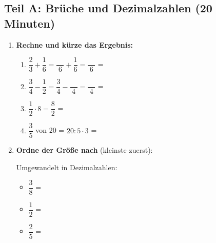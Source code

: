 \subsection*{Teil A: Brüche und Dezimalzahlen (20 Minuten)}

\begin{enumerate}[label=\arabic*.]
    \item \textbf{Rechne und kürze das Ergebnis:}

    \begin{enumerate}[label=\alph*)]
        \item $\dfrac{2}{3} + \dfrac{1}{6} = \dfrac{\phantom{00}}{6} + \dfrac{1}{6} = \dfrac{\phantom{00}}{6}$ = \underline{\hspace{3cm}}

        \item $\dfrac{3}{4} - \dfrac{1}{2} = \dfrac{3}{4} - \dfrac{\phantom{00}}{4} = \dfrac{\phantom{00}}{4}$ = \underline{\hspace{3cm}}

        \item $\dfrac{1}{2} \cdot 8 = \dfrac{8}{2}$ = \underline{\hspace{3cm}}

        \item $\dfrac{3}{5}$ von 20 = $20 : 5 \cdot 3$ = \underline{\hspace{3cm}}
    \end{enumerate}

    \vspace{0.5cm}

    \item \textbf{Ordne der Größe nach} (kleinste zuerst):

    \begin{center}
         \quad {} \quad {} \quad {} \quad {}
    \end{center}

    Umgewandelt in Dezimalzahlen:
    \begin{itemize}
        \item $\dfrac{3}{8}$ = \underline{\hspace{2cm}}
        \item $\dfrac{1}{2}$ = \underline{\hspace{2cm}}
        \item $\dfrac{2}{5}$ = \underline{\hspace{2cm}}
    \end{itemize}


\end{enumerate}
